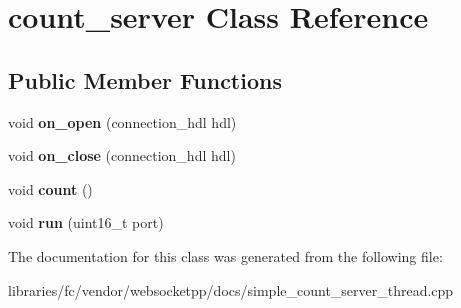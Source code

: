 \hypertarget{classcount__server}{}\section{count\+\_\+server Class Reference}
\label{classcount__server}
\subsection*{Public Member Functions}
\begin{DoxyCompactItemize}
\item 
\mbox{\label{classcount__server_a1362726d44346611d3feebc4cb1ea5e5}} 
void {\bfseries on\+\_\+open} (connection\+\_\+hdl hdl)
\item 
\mbox{\label{classcount__server_a347af2b96482796cb5c0c7ac85141cc3}} 
void {\bfseries on\+\_\+close} (connection\+\_\+hdl hdl)
\item 
\mbox{\label{classcount__server_a06a8dba8a9a887972faefab77a95ca0c}} 
void {\bfseries count} ()
\item 
\mbox{\label{classcount__server_a60a93e888b63c87badb9c7b9f74a8985}} 
void {\bfseries run} (uint16\+\_\+t port)
\end{DoxyCompactItemize}


The documentation for this class was generated from the following file\+:\begin{DoxyCompactItemize}
\item 
libraries/fc/vendor/websocketpp/docs/simple\+\_\+count\+\_\+server\+\_\+thread.\+cpp\end{DoxyCompactItemize}
